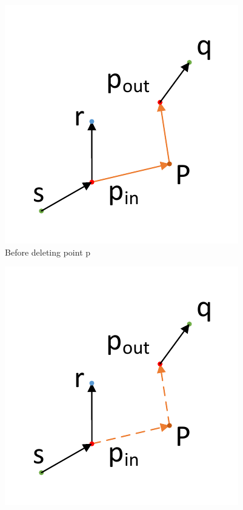 \begin{figure}[h]
	\centering
	\begin{minipage}{0.49\linewidth}
		\centering
		\vspace{3pt}
		\includegraphics[width=\textwidth]{fig/Example/MSNET_delete_before.pdf}
		Before deleting point p
	\end{minipage}
	\begin{minipage}{0.49\linewidth}
		\centering
		\vspace{3pt}
		\includegraphics[width=\textwidth]{fig/Example/MSNET_delete_policyA.pdf}

\end{minipage}
\end{figure}
